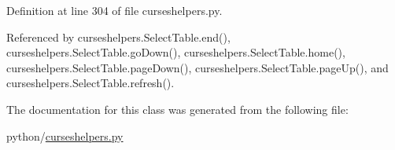 Definition at line 304 of file curseshelpers.\-py.



Referenced by curseshelpers.\-Select\-Table.\-end(), curseshelpers.\-Select\-Table.\-go\-Down(), curseshelpers.\-Select\-Table.\-home(), curseshelpers.\-Select\-Table.\-page\-Down(), curseshelpers.\-Select\-Table.\-page\-Up(), and curseshelpers.\-Select\-Table.\-refresh().



The documentation for this class was generated from the following file\-:\begin{DoxyCompactItemize}
\item 
python/\hyperlink{curseshelpers_8py}{curseshelpers.\-py}\end{DoxyCompactItemize}
